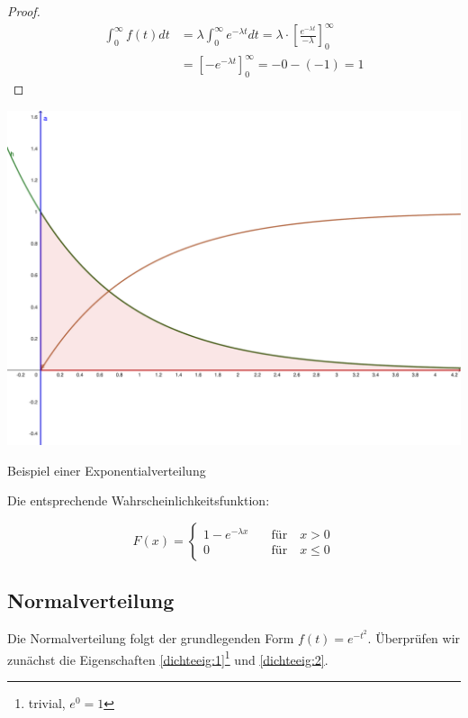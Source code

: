 \documentclass{tufte-handout}
\theoremstyle{own}
\begin{document}
\begin{proof}
\begin{align*}
\int_0^\infty f(t) dt &= \lambda \int_0^\infty e^{-\lambda t} dt = \lambda \cdot [\frac{e^{-\lambda t}}{- \lambda}]_0^\infty \\
	&= [-e^{-\lambda t}]_0^\infty = -0 - (-1) = 1
\end{align*}
\end{proof}

\begin{marginfigure}
	\includegraphics{exponentialverteilung}
	\caption{Beispiel einer Exponentialverteilung}
\end{marginfigure}

Die entsprechende Wahrscheinlichkeitsfunktion:

\begin{equation}
F(x) = \begin{cases}
1 - e^{- \lambda x} \hspace{1em} & \text{für} \hspace{1em} x >0 \\
0 \hspace{1em} & \text{für} \hspace{1em} x \leq 0
\end{cases}
\end{equation}

\subsection{Normalverteilung}

Die Normalverteilung folgt der grundlegenden Form $f(t) = e^{- t^2}$. Überprüfen wir zunächst
die Eigenschaften \eqref{dichteeig:1}\footnote{trivial, $e^0 = 1$} und \eqref{dichteeig:2}.
\end{document}
